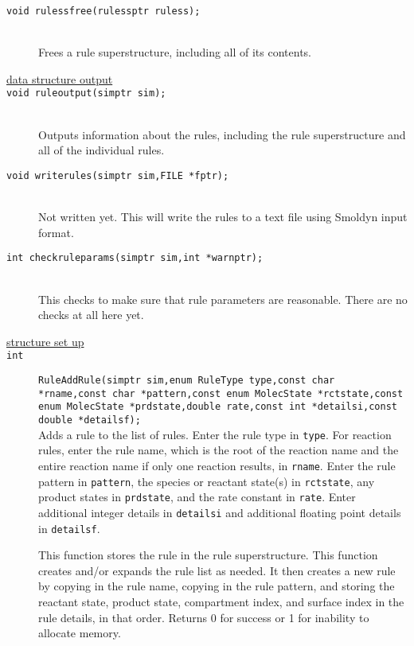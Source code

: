 \documentclass {book}
\begin{document}
\begin{description}
\item[\texttt{void rulessfree(rulessptr ruless);}]
\hfill \\
Frees a rule superstructure, including all of its contents.

\item[\underline{data structure output}]

\item[\texttt{void ruleoutput(simptr sim);}]
\hfill \\
Outputs information about the rules, including the rule superstructure and all of the individual rules.

\item[\texttt{void writerules(simptr sim,FILE *fptr);}]
\hfill \\
Not written yet. This will write the rules to a text file using Smoldyn input format.

\item[\texttt{int checkruleparams(simptr sim,int *warnptr);}]
\hfill \\
This checks to make sure that rule parameters are reasonable. There are no checks at all here yet.

\item[\underline{structure set up}]

\item[\texttt{int}]
\texttt{RuleAddRule(simptr sim,enum RuleType type,const char *rname,const char *pattern,const enum MolecState *rctstate,const enum MolecState *prdstate,double rate,const int *detailsi,const double *detailsf);}
\hfill \\
Adds a rule to the list of rules. Enter the rule type in \texttt{type}. For reaction rules, enter the rule name, which is the root of the reaction name and the entire reaction name if only one reaction results, in \texttt{rname}. Enter the rule pattern in \texttt{pattern}, the species or reactant state(s) in \texttt{rctstate}, any product states in \texttt{prdstate}, and the rate constant in \texttt{rate}. Enter additional integer details in \texttt{detailsi} and additional floating point details in \texttt{detailsf}.

This function stores the rule in the rule superstructure. This function creates and/or expands the rule list as needed. It then creates a new rule by copying in the rule name, copying in the rule pattern, and storing the reactant state, product state, compartment index, and surface index in the rule details, in that order. Returns 0 for success or 1 for inability to allocate memory.


\end{description}
\end{document}
